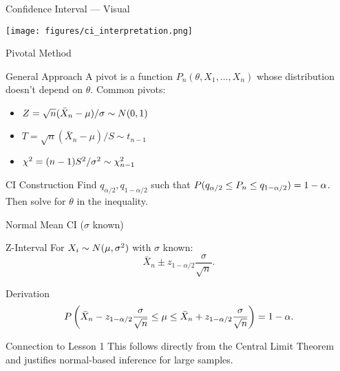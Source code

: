 \begin{frame}{Confidence Interval --- Visual}
  \begin{center}
    \texttt{[image: figures/ci\_interpretation.png]}
  \end{center}
\end{frame}

\begin{frame}{Pivotal Method}
  \begin{block}{General Approach}
    A pivot is a function $P_n(\theta, X_1,\dots,X_n)$ whose distribution
    doesn't depend on $\theta$. Common pivots:
    \begin{itemize}
      \item $Z = \sqrt{n}(\bar{X}_n - \mu)/\sigma \sim \Normal(0,1)$
      \item $T = \sqrt{n}(\bar{X}_n - \mu)/S \sim t_{n-1}$
      \item $\chi^2 = (n-1)S^2 / \sigma^2 \sim \ChiSq_{n-1}$
    \end{itemize}
  \end{block}

  \begin{block}{CI Construction}
    Find $q_{\alpha/2}, q_{1-\alpha/2}$ such that $\P(q_{\alpha/2} \leq P_n \leq q_{1-\alpha/2}) = 1-\alpha$.
    Then solve for $\theta$ in the inequality.
  \end{block}
\end{frame}

\begin{frame}{Normal Mean CI ($\sigma$ known)}
  \begin{block}{Z-Interval}
    For $X_i \sim \Normal(\mu, \sigma^2)$ with $\sigma$ known:
    \[\bar{X}_n \pm z_{1-\alpha/2} \frac{\sigma}{\sqrt{n}}.\]
  \end{block}

  \begin{block}{Derivation}
    \[\P\left(\bar{X}_n - z_{1-\alpha/2} \frac{\sigma}{\sqrt{n}} \leq \mu \leq \bar{X}_n + z_{1-\alpha/2} \frac{\sigma}{\sqrt{n}}\right) = 1-\alpha.\]
  \end{block}

  \begin{block}{Connection to Lesson 1}
    This follows directly from the Central Limit Theorem and justifies
    normal-based inference for large samples.
  \end{block}
\end{frame}

